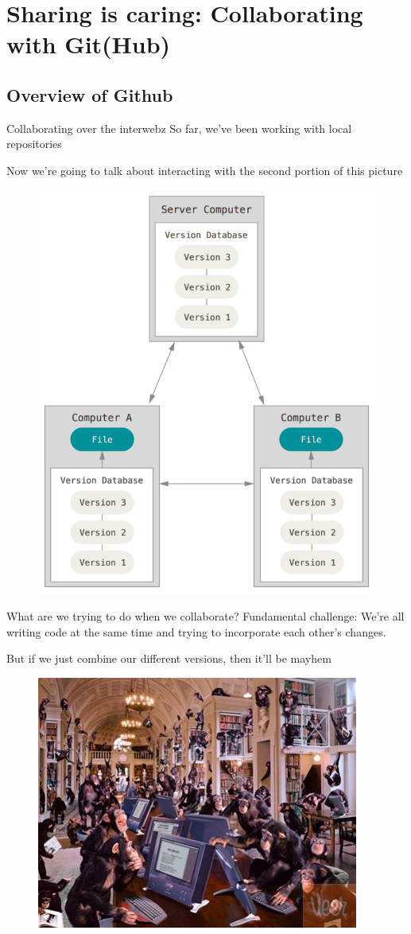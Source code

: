 \documentclass[pdf]{beamer} %
\begin{document}
\section{Sharing is caring: Collaborating with Git(Hub)}
\subsection{Overview of Github}
\begin{frame}[t]{Collaborating over the interwebz}
    So far, we've been working with local repositories

    \bigskip
    Now we're going to talk about interacting with the second portion of this picture
    \begin{figure}[htpb]
        \centering
        \includegraphics[width=0.4\linewidth]{fig/git-summary.png}
        \label{fig:git-summary}
    \end{figure}
\end{frame}

\begin{frame}[t]{What are we trying to do when we collaborate?}
   Fundamental challenge: We're all writing code at the same time and trying to incorporate each other's changes.

   \bigskip
   But if we just combine our different versions, then it'll be mayhem

   \begin{figure}[htpb]
       \centering
       \includegraphics[width=0.8\linewidth]{fig/monkeys-on-keyboards.jpg}
       \label{fig:fig/monkeys-on-keyboards}
   \end{figure}
\end{frame}
\end{document}
